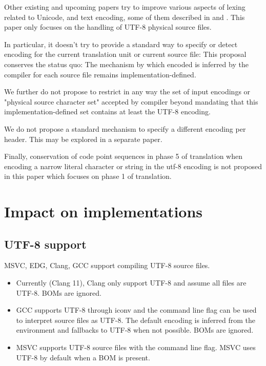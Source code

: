 \documentclass{wg21}
\begin{document}
Other existing and upcoming papers try to improve various aspects of lexing related to Unicode, and text encoding, some of them described in 
and .
This paper only focuses on the handling of UTF-8 physical source files.

In particular, it doesn't try to provide a standard  way to specify or detect encoding for the current translation unit or current source file:
This proposal conserves the status quo: The mechanism by which encoded is inferred by the compiler for each source file remains implementation-defined.

We further do not propose to restrict in any way the set of input encodings or "physical source character set"
accepted by compiler beyond mandating that this implementation-defined set contains at least the UTF-8 encoding.

We do not propose a standard mechanism to specify a different encoding per header. This may be explored in a separate paper.

Finally, conservation of code point sequences in phase 5 of translation when encoding a narrow literal character or string in the utf-8
encoding is not proposed in this paper which focuses on phase 1 of translation.




\section{Impact on implementations}

\subsection{UTF-8 support}
MSVC, EDG, Clang, GCC support compiling UTF-8 source files.

\begin{itemize}
\item Currently (Clang 11), Clang only support UTF-8 and assume all files are UTF-8. BOMs are ignored.
\item GCC supports UTF-8 through iconv and the command line flag  can be used to interpret source files as UTF-8.
The default encoding is inferred from the environment and fallbacks to UTF-8 when not possible. BOMs are ignored.
\item MSVC supports UTF-8 source files with the  command line flag. MSVC uses UTF-8 by default when a BOM is present.
\end{itemize}
\end{document}
